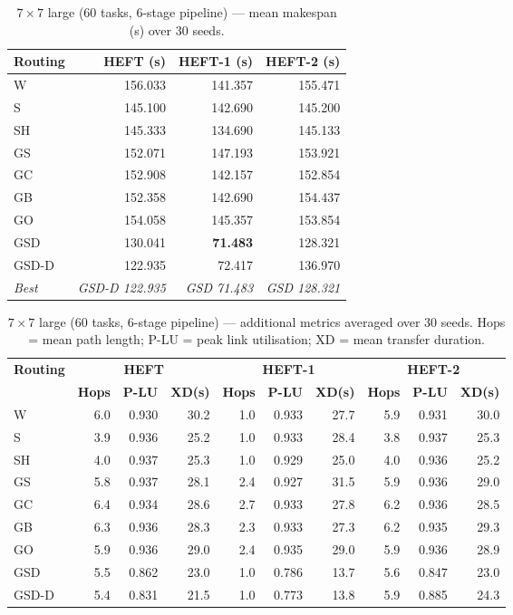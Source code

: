 \documentclass[11pt]{article}
\newcommand{\win}[1]{\textcolor{green!50!black}{\textbf{#1}}}
\newcommand{\bad}[1]{\textcolor{red!70!black}{#1}}
\begin{document}
\begin{table}[H]
\centering\small
\begin{tabular}{l r r r}
\toprule
\textbf{Routing} & \textbf{HEFT (s)} & \textbf{HEFT-1 (s)} & \textbf{HEFT-2 (s)} \\
\midrule
  W & \bad{156.033} & 141.357 & \bad{155.471} \\
  S & 145.100 & 142.690 & 145.200 \\
  SH & 145.333 & 134.690 & 145.133 \\
  GS & 152.071 & \bad{147.193} & 153.921 \\
  GC & 152.908 & 142.157 & 152.854 \\
  GB & 152.358 & 142.690 & 154.437 \\
  GO & 154.058 & 145.357 & 153.854 \\
  GSD & 130.041 & \win{71.483} & 128.321 \\
  GSD-D & 122.935 & 72.417 & 136.970 \\
\midrule
  \textit{Best} & \textit{GSD-D 122.935} & \textit{GSD 71.483} & \textit{GSD 128.321} \\
\bottomrule
\end{tabular}
\caption{$7\times7$ large (60 tasks, 6-stage pipeline) --- mean makespan (s) over 30 seeds.}
\end{table}

\begin{table}[H]
\centering\small
\begin{tabular}{l r r r r r r r r r}
\toprule
\textbf{Routing} & \multicolumn{3}{c}{\textbf{HEFT}} & \multicolumn{3}{c}{\textbf{HEFT-1}} & \multicolumn{3}{c}{\textbf{HEFT-2}} \\
\cmidrule(lr){2-4}\cmidrule(lr){5-7}\cmidrule(lr){8-10}
& \textbf{Hops} & \textbf{P-LU} & \textbf{XD(s)} & \textbf{Hops} & \textbf{P-LU} & \textbf{XD(s)} & \textbf{Hops} & \textbf{P-LU} & \textbf{XD(s)} \\
\midrule
  W & 6.0 & 0.930 & 30.2 & 1.0 & 0.933 & 27.7 & 5.9 & 0.931 & 30.0 \\
  S & 3.9 & 0.936 & 25.2 & 1.0 & 0.933 & 28.4 & 3.8 & 0.937 & 25.3 \\
  SH & 4.0 & 0.937 & 25.3 & 1.0 & 0.929 & 25.0 & 4.0 & 0.936 & 25.2 \\
  GS & 5.8 & 0.937 & 28.1 & 2.4 & 0.927 & 31.5 & 5.9 & 0.936 & 29.0 \\
  GC & 6.4 & 0.934 & 28.6 & 2.7 & 0.933 & 27.8 & 6.2 & 0.936 & 28.5 \\
  GB & 6.3 & 0.936 & 28.3 & 2.3 & 0.933 & 27.3 & 6.2 & 0.935 & 29.3 \\
  GO & 5.9 & 0.936 & 29.0 & 2.4 & 0.935 & 29.0 & 5.9 & 0.936 & 28.9 \\
  GSD & 5.5 & 0.862 & 23.0 & 1.0 & 0.786 & 13.7 & 5.6 & 0.847 & 23.0 \\
  GSD-D & 5.4 & 0.831 & 21.5 & 1.0 & 0.773 & 13.8 & 5.9 & 0.885 & 24.3 \\
\bottomrule
\end{tabular}
\caption{$7\times7$ large (60 tasks, 6-stage pipeline) --- additional metrics averaged over 30 seeds. Hops = mean path length; P-LU = peak link utilisation; XD = mean transfer duration.}
\end{table}
\end{document}
